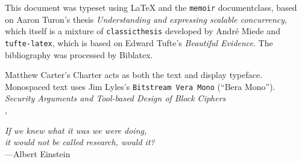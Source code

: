 This document was typeset using \LaTeX{} and the \texttt{memoir} documentclass, based on Aaron Turon's thesis \emph{Understanding and expressing scalable concurrency}, which itself is a mixture of \texttt{classicthesis} developed by Andr\'e Miede and \texttt{tufte-latex}, which is based on Edward Tufte's \emph{Beautiful Evidence}.
The bibliography was processed by Biblatex.

Matthew Carter's \textrm{Charter} acts as both the text and display typeface.
Monospaced text uses Jim Lyles's \texttt{Bitstream Vera Mono} (\enquote{Bera Mono}).\\[2em]
\textit{Security Arguments and Tool-based Design of Block Ciphers}\\
\textcopyright{} \thedate{}, \theauthor{}
\clearpage{}

\thispagestyle{empty}
\vphantom{.}
\vfill
{%
    \flushright{}
    \emph{If we knew what it was we were doing,\\
          it would not be called research, would it?}\\
    \hfill---Albert Einstein
}
\vfill
\vfill

\clearpage{}
